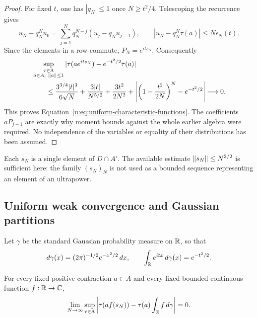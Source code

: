 \begin{proof}
For fixed $t$, one has $|q_N|\leq1$ once $N\geq t^2/4$.
Telescoping the recurrence gives
\[
  u_N-q_N^Nu_0
    =\sum_{j=1}^N q_N^{N-j}(u_j-q_Nu_{j-1}),
  \qquad
  |u_N-q_N^N\tau(a)|\leq N\epsilon_N(t).
\]
Since the elements in a row commute, $P_N=e^{its_N}$.
Consequently
\begin{equation}
\label{u:eq:quantitative-clt}
\begin{split}
 &\sup_{\substack{\tau\in\Lambda\\a\in A,\ \lVert a\rVert\leq1}}
   |\tau(ae^{its_N})-e^{-t^2/2}\tau(a)|\\
 &\qquad\leq
   \frac{3^{3/4}|t|^3}{6\sqrt N}
   +\frac{3|t|}{N^{5/2}}+\frac{3t^2}{2N^2}
   +\left|\left(1-\frac{t^2}{2N}\right)^N-e^{-t^2/2}\right|
   \longrightarrow0.
\end{split}
\end{equation}
This proves Equation~\eqref{u:eq:uniform-characteristic-functions}.
The coefficients $aP_{j-1}$ are exactly why moment bounds against the
whole earlier algebra were required.  No independence of the variables
or equality of their distributions has been assumed.
\end{proof}

Each $s_N$ is a single element of $D\cap A'$.  The available estimate
$\lVert s_N\rVert\leq N^{3/2}$ is sufficient here: the family $(s_N)_N$ is
not used as a bounded sequence representing an element of an
ultrapower.

\subsection{Uniform weak convergence and Gaussian partitions}

Let $\gamma$ be the standard Gaussian probability measure on $\mathbb R$,
so that
\[
  d\gamma(x)=(2\pi)^{-1/2}e^{-x^2/2}\,dx,
  \qquad \int_{\mathbb R}e^{itx}\,d\gamma(x)=e^{-t^2/2}.
\]

\begin{lemma}
\label{u:lem:uniform-weak-convergence}
For every fixed positive contraction $a\in A$ and every fixed bounded
continuous function $f:\mathbb R\to\mathbb C$,
\begin{equation}
\label{u:eq:uniform-weak-convergence}
  \lim_{N\to\infty}\sup_{\tau\in\Lambda}
  \left|\tau(af(s_N))-\tau(a)\int_{\mathbb R}f\,d\gamma\right|=0.
\end{equation}
\end{lemma}

